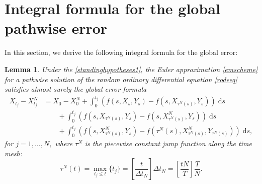 \documentclass[reqno,12pt]{amsart}
\theoremstyle{plain} %
\newtheorem{lemma}{Lemma}[section]
\theoremstyle{definition} %
\begin{document}
\section{Integral formula for the global pathwise error}

In this section, we derive the following integral formula for the global error:
\begin{lemma}
    \label{lemglobalerrorintegralformula}
    Under the \cref{standinghypotheses1}, the Euler approximation \eqref{emscheme} for a pathwise solution of the random ordinary differential equation \eqref{rodeeq} satisfies almost surely the global error formula
    \begin{equation}
        \label{globalerrorintegralformula}
        \begin{aligned}
            X_{t_j} - X_{t_j}^N & = X_0 - X_0^N + \int_0^{t_j} \left( f(s, X_s, Y_s) - f(s, X_{\tau^N(s)}, Y_s) \right)\;\mathrm{d}s  \\ 
            & \qquad + \int_{0}^{t_j} \left( f(s, X_{\tau^N(s)}, Y_s) - f(s, X_{\tau^N(s)}^N, Y_s) \right)\;\mathrm{d}s \\
            & \qquad + \int_0^{t_j} \left( f(s, X_{\tau^N(s)}^N, Y_s) - f(\tau^N(s), X_{\tau^N(s)}^N, Y_{\tau^N(s)}) \right)\;\mathrm{d}s,
        \end{aligned}
    \end{equation}
    for $j = 1, \ldots, N,$ where $\tau^N$ is the piecewise constant jump function along the time mesh:
    \begin{equation}
        \label{tauNt}
        \tau^N(t) = \max_{t_j \leq t}\{t_j\} = \left[\frac{t}{\Delta t_N}\right]\Delta t_N = \left[\frac{tN}{T}\right]\frac{T}{N}.
    \end{equation}
\end{lemma}
\end{document}
